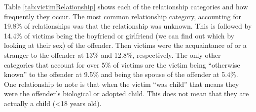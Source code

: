 \documentclass[
]{krantz}
\begin{document}
Table \ref{tab:victimRelationship} shows each of the
relationship categories and how frequently they occur. The
most common relationship category, accounting for 19.8\% of
relationships was that the relationship was unknown. This is
followed by 14.4\% of victims being the boyfriend or
girlfriend (we can find out which by looking at their sex)
of the offender. Then victims were the acquaintance of or a
stranger to the offender at 13\% and 12.8\%, respectively.
The only other categories that account for over 5\% of
victims are the victim being ``otherwise known'' to the
offender at 9.5\% and being the spouse of the offender at
5.4\%. One relationship to note is that when the victim
``was child'' that means they were the offender's biological
or adopted child. This does not mean that they are actually
a child (\textless18 years old).
\end{document}
